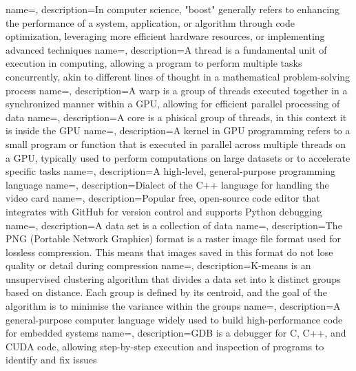 {
    name=,
    description={In computer science, "boost" generally refers to enhancing the performance of a system, application, or algorithm through code optimization, leveraging more efficient hardware resources, or implementing advanced techniques}
}
{
    name=,
    description={A thread is a fundamental unit of execution in computing, allowing a program to perform multiple tasks concurrently, akin to different lines of thought in a mathematical problem-solving process}
}
{
    name=,
    description={A warp is a group of threads executed together in a synchronized manner within a GPU, allowing for efficient parallel processing of data}
}
{
name=,
description={A core is a phisical group of threads, in this context it is inside the GPU}
}
{
    name=,
    description={A kernel in GPU programming refers to a small program or function that is executed in parallel across multiple threads on a GPU, typically used to perform computations on large datasets or to accelerate specific tasks}
}
{
    name=,
    description={A high-level, general-purpose programming language}
}
{
    name=,
    description={Dialect of the C++ language for handling the video card}
}
{
name=,
description={Popular free, open-source code editor that integrates with GitHub for version control and supports Python debugging}
}
{
    name=,
    description={A data set is a collection of data}
}
{
    name=,
    description={The PNG (Portable Network Graphics) format is a raster image file format used for lossless compression. This means that images saved in this format do not lose quality or detail during compression}
}
{
    name=,
    description={K-means is an unsupervised clustering algorithm that divides a data set into k distinct groups based on distance. Each group is defined by its centroid, and the goal of the algorithm is to minimise the variance within the groups}
}
{
    name=,
    description={A general-purpose computer language widely used to build high-performance code for embedded systems}
}
{
name=,
description={GDB is a debugger for C, C++, and CUDA code, allowing step-by-step execution and inspection of programs to identify and fix issues}
}
